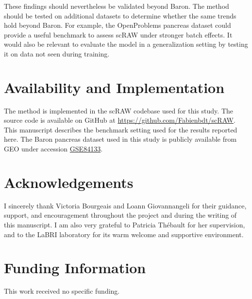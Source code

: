 \documentclass[11pt,a4paper]{article}
\begin{document}
These findings should nevertheless be validated beyond Baron.
The method should be tested on additional datasets to determine
whether the same trends hold beyond Baron. For example, the OpenProblems
pancreas dataset \cite{openproblems_pancreas} could provide a useful benchmark to assess scRAW under
stronger batch effects. It would also be relevant to evaluate the model
in a generalization setting by testing it on data not seen during
training.
\section{Availability and Implementation}

The method is implemented in the scRAW codebase used for this study.
The source code is available on GitHub at
\url{https://github.com/Fabienbdt/scRAW}. This manuscript describes the
benchmark setting used for the results reported here. The Baron pancreas
dataset used in this study is publicly available from GEO under
accession \href{https://www.ncbi.nlm.nih.gov/geo/query/acc.cgi?acc=GSE84133}{GSE84133}.

\section{Acknowledgements}

I sincerely thank Victoria Bourgeais and Loann Giovannangeli for their
guidance, support, and encouragement throughout the project and during
the writing of this manuscript. I am also very grateful to Patricia
Thébault for her supervision, and to the LaBRI laboratory for its warm
welcome and supportive environment.

\section{Funding Information}

This work received no specific funding.
\end{document}
